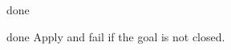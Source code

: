 \begin{tactic}{done}
  \begin{tsyntax}[empty]{done}
  Apply  and fail if the goal is not closed.
  \end{tsyntax}
\end{tactic}
